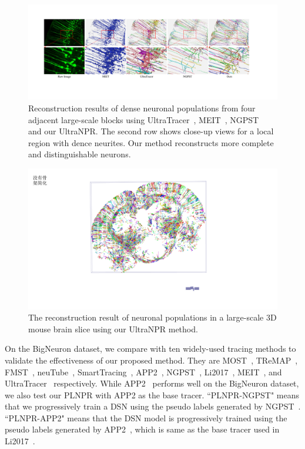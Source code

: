 \begin{figure}[t]
	\centering
	\includegraphics[width=\textwidth]{./Illustrations/comparison_ultranpr.pdf}
	\caption{Reconstruction results of dense neuronal populations from four adjacent large-scale blocks using UltraTracer~\cite{Peng2017}, MEIT~\cite{Wang2018}, NGPST~\cite{Quan2015} and our UltraNPR. The second row shows close-up views for a local region with dence neurites. Our method reconstructs more complete and distinguishable neurons. 
	}
	\label{fig:reconstruct_blocks}
\end{figure}

\begin{figure}[t]
	\centering
	\includegraphics[width=1\columnwidth]{./Illustrations/brain_slice.pdf}
	\caption{The reconstruction result of neuronal populations in a large-scale 3D mouse brain slice using our UltraNPR method.}
	\label{fig:reconstruct_brain}
\end{figure}

On the BigNeuron dataset, we compare with ten widely-used tracing methods to validate the effectiveness of our proposed method.
They are MOST~\cite{Wu2014}, TReMAP~\cite{Zhou2016}, FMST~\cite{Yang2019}, neuTube~\cite{Feng2015}, SmartTracing~\cite{Chen2015}, APP2~\cite{Xiao2013}, NGPST~\cite{Quan2015}, Li2017~\cite{Li2017},   MEIT~\cite{Wang2018}, and UltraTracer~\cite{Peng2017} respectively.
%
While APP2~\cite{Xiao2013} performs well on the BigNeuron dataset, we also test our PLNPR with APP2 as the base tracer. 
``PLNPR-NGPST" means that we progressively train a DSN using the pseudo labels generated by NGPST~\cite{Quan2015}.
``PLNPR-APP2" means that the DSN model is progressively trained using the pseudo labels generated by APP2~\cite{Xiao2013}, which is same as the base tracer used in Li2017~\cite{Li2017}.



